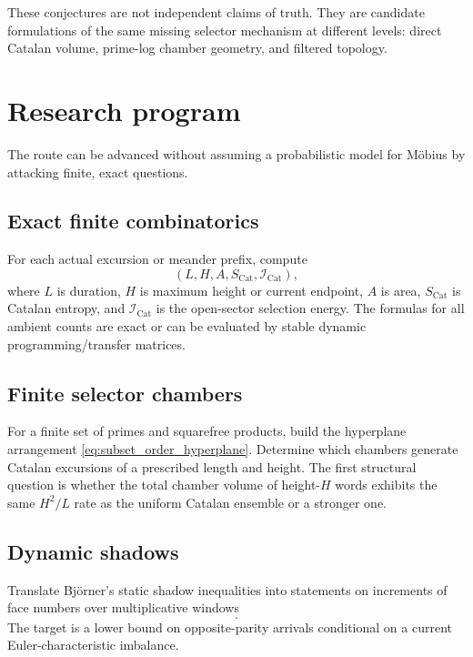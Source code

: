 \documentclass[11pt]{amsart}
\numberwithin{equation}{section}
\theoremstyle{plain}
\theoremstyle{definition}
\theoremstyle{remark}
\newcommand{\Icat}{\mathcal{I}_{\mathrm{Cat}}}
\begin{document}
These conjectures are not independent claims of truth.  They are candidate formulations of the same missing selector mechanism at different levels: direct Catalan volume, prime-log chamber geometry, and filtered topology.

\section{Research program}
\label{sec:research_program}

The route can be advanced without assuming a probabilistic model for M\"obius by attacking finite, exact questions.

\subsection{Exact finite combinatorics}
\label{subsec:program_exact}

For each actual excursion or meander prefix, compute
\begin{equation}
(L,H,A,S_{\mathrm{Cat}},\Icat),
\label{eq:finite_observables}
\end{equation}
where $L$ is duration, $H$ is maximum height or current endpoint, $A$ is area, $S_{\mathrm{Cat}}$ is Catalan entropy, and $\Icat$ is the open-sector selection energy.  The formulas for all ambient counts are exact or can be evaluated by stable dynamic programming/transfer matrices.

\subsection{Finite selector chambers}
\label{subsec:program_chambers}

For a finite set of primes and squarefree products, build the hyperplane arrangement \eqref{eq:subset_order_hyperplane}.  Determine which chambers generate Catalan excursions of a prescribed length and height.  The first structural question is whether the total chamber volume of height-$H$ words exhibits the same $H^2/L$ rate as the uniform Catalan ensemble or a stronger one.

\subsection{Dynamic shadows}
\label{subsec:program_shadows}

Translate Bj\"orner's static shadow inequalities into statements on increments of face numbers over multiplicative windows
\begin{equation}
[x,xe^{\delta}].
\label{eq:multiplicative_window}
\end{equation}
The target is a lower bound on opposite-parity arrivals conditional on a current Euler-characteristic imbalance.
\end{document}
